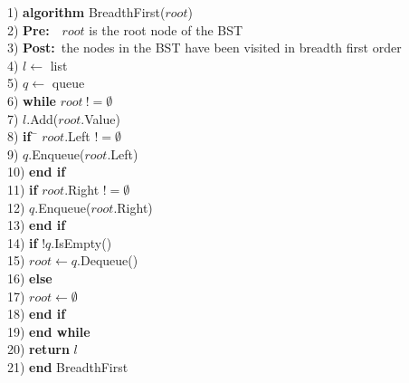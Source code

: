 \newpage
\begin{tabbing}
1)  \textbf{alg}\= \textbf{orithm} BreadthFirst($root$) \\
2)  \> \textbf{Pre:}~~$root$ is the root node of the BST \\
3)  \> \textbf{Post:}~the nodes in the BST have been visited in breadth first order \\
4)  \> $l \leftarrow$ list \\
5)  \> $q \leftarrow$ queue \\
6)  \> \textbf{whi}\= \textbf{le} $root~!= \emptyset$ \\
7)  \> \> $l$.Add($root$.Value) \\
8)  \> \> \textbf{if}~\= $root$.Left $!= \emptyset$ \\
9)  \> \> \> $q$.Enqueue($root$.Left) \\
10) \> \> \textbf{end if} \\
11) \> \> \textbf{if} $root$.Right $!= \emptyset$ \\
12) \> \> \> $q$.Enqueue($root$.Right) \\
13) \> \> \textbf{end if} \\
14) \> \> \textbf{if} $!q$.IsEmpty() \\
15) \> \> \> $root \leftarrow q$.Dequeue() \\
16) \> \> \textbf{else} \\
17) \> \> \> $root \leftarrow \emptyset$ \\
18) \> \> \textbf{end if} \\
19) \> \textbf{end while} \\
20) \> \textbf{return} $l$ \\
21) \textbf{end} BreadthFirst \\
\end{tabbing}
